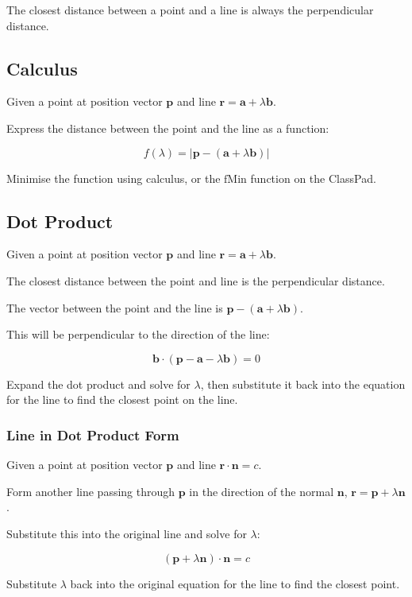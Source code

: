 \documentclass[a4paper,11pt]{article}
\newcommand{\bb}{\boldsymbol}
\begin{document}
The closest distance between a point and a line is always the perpendicular
distance.


\subsection{Calculus}

Given a point at position vector $\bb{p}$ and line
$\bb{r} = \bb{a} + \lambda \bb{b}$.

Express the distance between the point and the line as a function:

$$
f(\lambda) = \lvert \bb{p} - (\bb{a} + \lambda \bb{b}) \rvert
$$

Minimise the function using calculus, or the $\text{fMin}$ function on the
ClassPad.


\subsection{Dot Product}

Given a point at position vector $\bb{p}$ and line
$\bb{r} = \bb{a} + \lambda \bb{b}$.

The closest distance between the point and line is the perpendicular distance.

The vector between the point and the line is
$\bb{p} - (\bb{a} + \lambda \bb{b})$.

This will be perpendicular to the direction of the line:

$$
\bb{b} \cdot (\bb{p} - \bb{a} - \lambda \bb{b}) = 0
$$

Expand the dot product and solve for $\lambda$, then substitute it back into the
equation for the line to find the closest point on the line.


\subsubsection{Line in Dot Product Form}

Given a point at position vector $\bb{p}$ and line $\bb{r} \cdot \bb{n} = c$.

Form another line passing through $\bb{p}$ in the direction of the normal
$\bb{n}$, $\bb{r} = \bb{p} + \lambda \bb{n}$.

Substitute this into the original line and solve for $\lambda$:

$$
(\bb{p} + \lambda \bb{n}) \cdot \bb{n} = c
$$

Substitute $\lambda$ back into the original equation for the line to find the
closest point.
\end{document}

